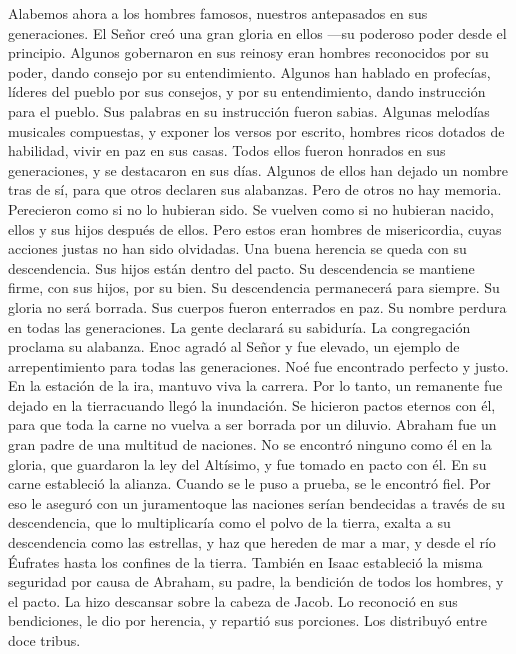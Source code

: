  Alabemos ahora a los hombres famosos, nuestros
antepasados en sus generaciones.  El Señor creó una gran
gloria en ellos ---su poderoso poder desde el principio. 
Algunos gobernaron en sus reinosy eran hombres reconocidos por su poder,
dando consejo por su entendimiento. Algunos han hablado en profecías,
 líderes del pueblo por sus consejos, y por su
entendimiento, dando instrucción para el pueblo. Sus palabras en su
instrucción fueron sabias.  Algunas melodías musicales
compuestas, y exponer los versos por escrito,  hombres
ricos dotados de habilidad, vivir en paz en sus casas. 
Todos ellos fueron honrados en sus generaciones, y se destacaron en sus
días.  Algunos de ellos han dejado un nombre tras de sí,
para que otros declaren sus alabanzas.  Pero de otros no
hay memoria. Perecieron como si no lo hubieran sido. Se vuelven como si
no hubieran nacido, ellos y sus hijos después de ellos. 
Pero estos eran hombres de misericordia, cuyas acciones justas no han
sido olvidadas.  Una buena herencia se queda con su
descendencia. Sus hijos están dentro del pacto.  Su
descendencia se mantiene firme, con sus hijos, por su bien.
 Su descendencia permanecerá para siempre. Su gloria no
será borrada.  Sus cuerpos fueron enterrados en paz. Su
nombre perdura en todas las generaciones.  La gente
declarará su sabiduría. La congregación proclama su alabanza.
 Enoc agradó al Señor y fue elevado, un ejemplo de
arrepentimiento para todas las generaciones.  Noé fue
encontrado perfecto y justo. En la estación de la ira, mantuvo viva la
carrera. Por lo tanto, un remanente fue dejado en la tierracuando llegó
la inundación.  Se hicieron pactos eternos con él, para
que toda la carne no vuelva a ser borrada por un diluvio.
 Abraham fue un gran padre de una multitud de naciones.
No se encontró ninguno como él en la gloria,  que
guardaron la ley del Altísimo, y fue tomado en pacto con él. En su carne
estableció la alianza. Cuando se le puso a prueba, se le encontró fiel.
 Por eso le aseguró con un juramentoque las naciones
serían bendecidas a través de su descendencia, que lo multiplicaría como
el polvo de la tierra, exalta a su descendencia como las estrellas, y
haz que hereden de mar a mar, y desde el río Éufrates hasta los confines
de la tierra.  También en Isaac estableció la misma
seguridad por causa de Abraham, su padre, la bendición de todos los
hombres, y el pacto.  La hizo descansar sobre la cabeza
de Jacob. Lo reconoció en sus bendiciones, le dio por herencia, y
repartió sus porciones. Los distribuyó entre doce tribus.

